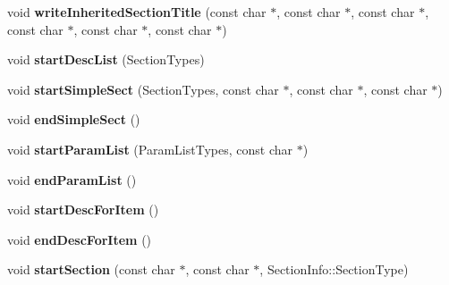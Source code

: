 \begin{DoxyCompactItemize}
\item 
\hypertarget{class_r_t_f_generator_a78c22cc38dae09d7200a1f4d3b9a3e50}{void {\bfseries write\-Inherited\-Section\-Title} (const char $\ast$, const char $\ast$, const char $\ast$, const char $\ast$, const char $\ast$, const char $\ast$)}\label{class_r_t_f_generator_a78c22cc38dae09d7200a1f4d3b9a3e50}

\item 
\hypertarget{class_r_t_f_generator_a9c0bb2efe62ee473e0751b8db35e847a}{void {\bfseries start\-Desc\-List} (Section\-Types)}\label{class_r_t_f_generator_a9c0bb2efe62ee473e0751b8db35e847a}

\item 
\hypertarget{class_r_t_f_generator_af78a3d7bf076c8f5e6bb859460a3437d}{void {\bfseries start\-Simple\-Sect} (Section\-Types, const char $\ast$, const char $\ast$, const char $\ast$)}\label{class_r_t_f_generator_af78a3d7bf076c8f5e6bb859460a3437d}

\item 
\hypertarget{class_r_t_f_generator_a845408bbcbfed31523c20fd170dd8b45}{void {\bfseries end\-Simple\-Sect} ()}\label{class_r_t_f_generator_a845408bbcbfed31523c20fd170dd8b45}

\item 
\hypertarget{class_r_t_f_generator_a914331c46e99ec8e8278a658f058bd15}{void {\bfseries start\-Param\-List} (Param\-List\-Types, const char $\ast$)}\label{class_r_t_f_generator_a914331c46e99ec8e8278a658f058bd15}

\item 
\hypertarget{class_r_t_f_generator_a0cea756e6f65da408378bedffe2b67d1}{void {\bfseries end\-Param\-List} ()}\label{class_r_t_f_generator_a0cea756e6f65da408378bedffe2b67d1}

\item 
\hypertarget{class_r_t_f_generator_aaeedab997793b96cdfc94f8b628d5a80}{void {\bfseries start\-Desc\-For\-Item} ()}\label{class_r_t_f_generator_aaeedab997793b96cdfc94f8b628d5a80}

\item 
\hypertarget{class_r_t_f_generator_a5cae5c5213649bfad6105e91ac818870}{void {\bfseries end\-Desc\-For\-Item} ()}\label{class_r_t_f_generator_a5cae5c5213649bfad6105e91ac818870}

\item 
\hypertarget{class_r_t_f_generator_a32fffbabcb45b670e3a6ac0471b99c50}{void {\bfseries start\-Section} (const char $\ast$, const char $\ast$, Section\-Info\-::\-Section\-Type)}\label{class_r_t_f_generator_a32fffbabcb45b670e3a6ac0471b99c50}


\end{DoxyCompactItemize}
